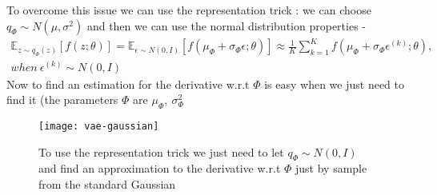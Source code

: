 To overcome this issue we can use the representation trick : we can choose $q_{\Phi} \sim N(\mu, \sigma^2)$ and then we can use the normal distribution properties - 
\begin{gather*}
\mathbb{E}_{z \sim q_{\Phi}(z)}[f(z;\theta)] = \mathbb{E}_{\epsilon \sim N(0,I)}[f(\mu_{\Phi} + \sigma_{\Phi}\epsilon;\theta)] \approx \frac{1}{K}\sum_{k=1}^{K}f(\mu_{\Phi} + \sigma_{\Phi}\epsilon^{(k)};\theta), \\ when \ \epsilon^{(k)} \sim N(0,I)
\end{gather*} 
Now to find an estimation for the derivative w.r.t $\Phi$ is easy when we just need to find it (the parameters $\Phi$ are $\mu_{\Phi}, \ \sigma^2_{\Phi}$
\begin{figure}[H]
\texttt{[image: vae-gaussian]}
\caption{To use the representation trick we just need to let $q_{\Phi}\sim N(0,I)$ and find an approximation to the derivative w.r.t $\Phi$ just by sample from the standard Gaussian}
\centering
\end{figure}
